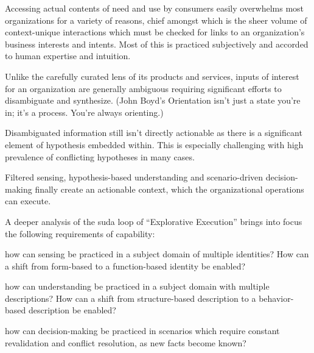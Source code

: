 \begin{description}[font=\bfseries,nosep,leftmargin=!,labelwidth=\widthof{\bfseries UNDERSTAND}]
    \item[SENSE] Accessing actual contents of need and use by consumers easily overwhelms most organizations
    for a variety of reasons, chief amongst which is the sheer volume of context-unique interactions which
    must be checked for links to an organization’s business interests and intents.
    Most of this is practiced subjectively and accorded to human expertise and intuition.
    \item[UNDERSTAND] Unlike the carefully curated lens of its products and services,
    inputs of interest for an organization are generally ambiguous requiring significant efforts to
    disambiguate and synthesize.
    (John Boyd’s Orientation isn’t just a state you’re in; it’s a process. You’re always orienting.)
    \item[DECIDE] Disambiguated information still isn’t directly actionable as there is a significant element of
    hypothesis embedded within.
    This is especially challenging with high prevalence of conflicting hypotheses in many cases.
    \item[ACT] Filtered sensing, hypothesis-based understanding and scenario-driven decision-making finally
    create an actionable context, which the organizational operations can execute.
\end{description}

A deeper analysis of the \gls{suda} loop of “Explorative Execution” brings into focus the following requirements
of capability:

\begin{description}[font=\bfseries,nosep,leftmargin=!,labelwidth=\widthof{\bfseries Open world ambiguity}]
    \item[Identity] how can sensing be practiced in a subject domain of multiple identities?
    How can a shift from form-based to a function-based identity be enabled?
    \item[Self-describing] how can understanding be practiced in a subject domain with multiple descriptions?
    How can a shift from structure-based description to a behavior-based description be enabled?
    \item[Open world ambiguity] how can decision-making be practiced in scenarios which require constant
    revalidation and conflict resolution, as new facts become known?
\end{description}

